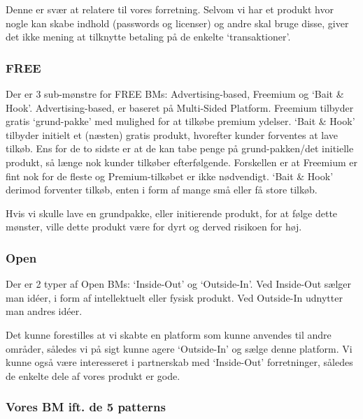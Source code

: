 Denne er svær at relatere til vores forretning.
Selvom vi har et produkt hvor nogle kan skabe indhold (passwords og licenser) og andre skal bruge disse, giver det ikke mening at tilknytte betaling på de enkelte `transaktioner'.

\subsubsection{FREE}
Der er 3 sub-mønstre for FREE BMs: Advertising-based, Freemium og `Bait \& Hook'.
Advertising-based, er baseret på Multi-Sided Platform.
Freemium tilbyder gratis `grund-pakke' med mulighed for at tilkøbe premium ydelser.
`Bait \& Hook' tilbyder initielt et (næsten) gratis produkt, hvorefter kunder forventes at lave tilkøb.
Ens for de to sidste er at de kan tabe penge på grund-pakken/det initielle produkt, så længe nok kunder tilkøber efterfølgende.
Forskellen er at Freemium er fint nok for de fleste og Premium-tilkøbet er ikke nødvendigt.
`Bait \& Hook' derimod forventer tilkøb, enten i form af mange små eller få store tilkøb.

Hvis vi skulle lave en grundpakke, eller initierende produkt, for at følge dette mønster, ville dette produkt være for dyrt og derved risikoen for høj.

\subsubsection{Open}
Der er 2 typer af Open BMs: `Inside-Out' og `Outside-In'.
Ved Inside-Out sælger man idéer, i form af intellektuelt eller fysisk produkt.
Ved Outside-In udnytter man andres idéer.

Det kunne forestilles at vi skabte en platform som kunne anvendes til andre områder, således vi på sigt kunne agere `Outside-In' og sælge denne platform.
Vi kunne også være interesseret i partnerskab med `Inside-Out' forretninger, således de enkelte dele af vores produkt er gode.

\subsubsection{Vores BM ift. de 5 patterns}
